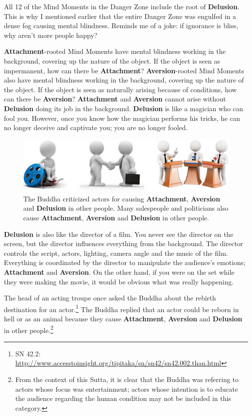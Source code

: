 All 12 of the Mind Moments in the Danger Zone include the root of \textbf{Delusion}. This is why I mentioned earlier that the entire Danger Zone was engulfed in a dense fog causing mental blindness. Reminds me of a joke: if ignorance is bliss, why aren’t more people happy?

\textbf{Attachment}-rooted Mind Moments have mental blindness working in the background, covering up the nature of the object. If the object is seen as impermanent, how can there be \textbf{Attachment}? \textbf{Aversion}-rooted Mind Moments also have mental blindness working in the background, covering up the nature of the object. If the object is seen as naturally arising because of conditions, how can there be \textbf{Aversion}? \textbf{Attachment} and \textbf{Aversion} cannot arise without \textbf{Delusion} doing its job in the background. \textbf{Delusion} is like a magician who can fool you. However, once you know how the magician performs his tricks, he can no longer deceive and captivate you; you are no longer fooled.

\begin{figure}[H]
\centering
\includegraphics[width=1.0\linewidth]{./Diagrams/Actors}
\caption{The Buddha criticized actors for causing \textbf{Attachment}, \textbf{Aversion} and \textbf{Delusion} in other people. Many salespeople and politicians also cause \textbf{Attachment}, \textbf{Aversion} and \textbf{Delusion} in other people.}
\label{fig:Actors}
\end{figure}

\textbf{Delusion} is also like the director of a film. You never see the director on the screen, but the director influences everything from the background. The director controls the script, actors, lighting, camera angle and the music of the film. Everything is coordinated by the director to manipulate the audience’s emotions; \textbf{Attachment} and \textbf{Aversion}. On the other hand, if you were on the set while they were making the movie, it would be obvious what was really happening.

The head of an acting troupe once asked the Buddha about the rebirth destination for an actor.\footnote{SN 42.2: \url{http://www.accesstoinsight.org/tipitaka/sn/sn42/sn42.002.than.html}} The Buddha replied that an actor could be reborn in hell or as an animal because they cause \textbf{Attachment}, \textbf{Aversion} and \textbf{Delusion} in other people.\footnote{From the context of this Sutta, it is clear that the Buddha was referring to actors whose focus was entertainment; actors whose intention is to educate the audience regarding the human condition may not be included in this category.} 

